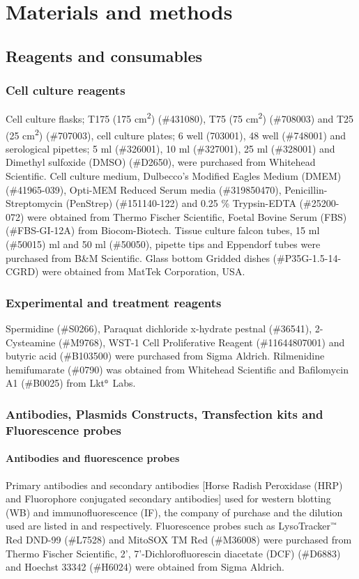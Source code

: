 \chapter{Materials and methods}
\section{Reagents and consumables}
\subsection{Cell culture reagents}
Cell culture flasks; T175 (175 cm\textsuperscript{2}) (\#431080), T75 (75 cm\textsuperscript{2}) (\#708003) and T25 (25 cm\textsuperscript{2}) (\#707003), cell culture plates; 6 well (703001), 48 well (\#748001) and serological pipettes; 5 ml (\#326001), 10 ml (\#327001), 25 ml (\#328001) and Dimethyl sulfoxide (DMSO) (\#D2650), were purchased from Whitehead Scientific. Cell culture medium, Dulbecco’s Modified Eagles Medium (DMEM) (\#41965-039), Opti-MEM Reduced Serum media (\#319850470), Penicillin-Streptomycin (PenStrep) (\#151140-122) and 0.25 \% Trypsin-EDTA (\#25200-072) were obtained from Thermo Fischer Scientific, Foetal Bovine Serum (FBS) (\#FBS-GI-12A) from Biocom-Biotech. Tissue culture falcon tubes, 15 ml (\#50015) ml and 50 ml (\#50050), pipette tips and Eppendorf tubes were purchased from B\&M Scientific. Glass bottom Gridded dishes (\#P35G-1.5-14-CGRD) were obtained from MatTek Corporation, USA.

\subsection{Experimental and treatment reagents}
Spermidine (\#S0266), Paraquat dichloride x-hydrate pestnal (\#36541), 2-Cysteamine (\#M9768), WST-1 Cell Proliferative Reagent (\#11644807001) and butyric acid (\#B103500) were purchased from Sigma Aldrich. Rilmenidine hemifumarate (\#0790) was obtained from Whitehead Scientific and Bafilomycin A1 (\#B0025) from Lkt${\textsuperscript{\tiny{\textregistered}}}$ Labs. 

\subsection{Antibodies, Plasmids Constructs, Transfection kits and Fluorescence probes}
\subsubsection{Antibodies and fluorescence probes}
Primary antibodies and secondary antibodies [Horse Radish Peroxidase (HRP) and Fluorophore conjugated secondary antibodies] used for western blotting (WB) and immunofluorescence (IF), the company of purchase and the dilution used are listed in  and  respectively. Fluorescence probes such as LysoTracker${\textsuperscript{\tiny{\texttrademark}}}$ Red DND-99 (\#L7528) and MitoSOX TM Red (\#M36008) were purchased from Thermo Fischer Scientific, 2', 7'-Dichlorofluorescin diacetate (DCF) (\#D6883) and Hoechst 33342 (\#H6024) were obtained from Sigma Aldrich.


